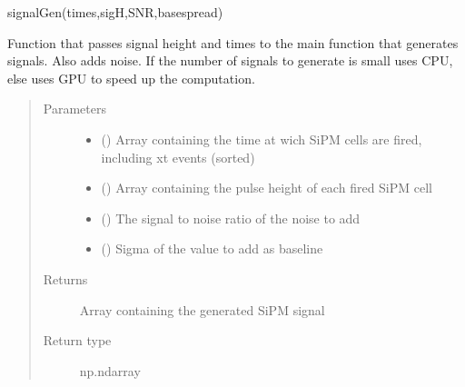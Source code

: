 \documentclass[letterpaper,10pt,english]{sphinxmanual}
\begin{document}
\begin{fulllineitems}
\label{\detokenize{structure:libs.libGPU.SiPMSignalAction}}
signalGen(times,sigH,SNR,basespread)

Function that passes signal height and times to the main function that generates signals. Also adds noise.
If the number of signals to generate is small uses CPU, else uses GPU to speed up the computation.
\begin{quote}\begin{description}
\item[{Parameters}] \leavevmode\begin{itemize}
\item {} 
 (\sphinxstyleliteralemphasis{\sphinxupquote{(}}\sphinxstyleliteralemphasis{\sphinxupquote{)}}) \textendash{} Array containing the time at wich SiPM cells are fired, including xt events (sorted)

\item {} 
 (\sphinxstyleliteralemphasis{\sphinxupquote{(}}\sphinxstyleliteralemphasis{\sphinxupquote{)}}) \textendash{} Array containing the pulse height of each fired SiPM cell

\item {} 
 () \textendash{} The signal to noise ratio of the noise to add

\item {} 
 () \textendash{} Sigma of the value to add as baseline

\end{itemize}

\item[{Returns}] \leavevmode
{} \textendash{} Array containing the generated SiPM signal

\item[{Return type}] \leavevmode
np.ndarray

\end{description}\end{quote}

\end{fulllineitems}
\end{document}
